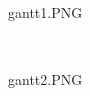 \begin{center}
\begin{image}{}{}{gantt1.PNG}
\end{image}
\\
\begin{image}{}{}{gantt2.PNG}
\end{image}
\end{center}
